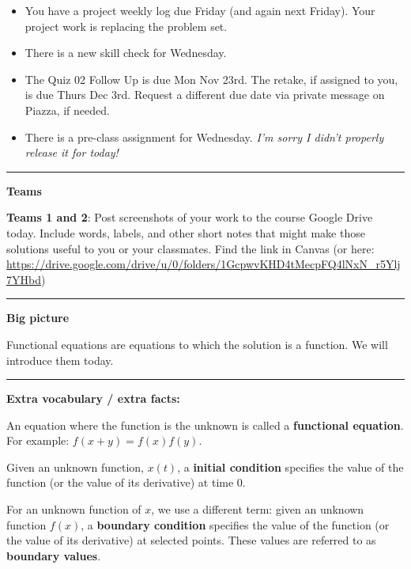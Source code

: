 \documentclass[12pt,letterpaper,noanswers]{exam}
\begin{document}
 \pdfpageheight 11in 
  \pdfpagewidth 8.5in

\noindent 




\begin{itemize}
\itemsep0em
\item You have a project weekly log due Friday (and again next Friday).  Your project work is replacing the problem set.
\item There is a new skill check for Wednesday.
\item The Quiz 02 Follow Up is due Mon Nov 23rd.  The retake, if assigned to you, is due Thurs Dec 3rd.  Request a different due date via private message on Piazza, if needed.
\item There is a pre-class assignment for Wednesday.  \emph{I'm sorry I didn't properly release it for today!}
\end{itemize}

\hrule
\vspace{0.2cm}



\noindent\textbf{Teams}



\noindent \textbf{Teams 1 and 2}: Post screenshots of your work to the course Google Drive today.  Include words, labels, and other short notes that might make those solutions useful to you or your classmates.  Find the link in Canvas (or here: \url{https://drive.google.com/drive/u/0/folders/1GcpwvKHD4tMecpFQ4lNxN_r5Ylj7YHbd})


\vspace{0.2cm}

\hrule
\vspace{0.2cm}


\noindent\textbf{Big picture}

Functional equations are equations to which the solution is a function.  We will introduce them today.

\vspace{0.2cm}
\hrule
\vspace{0.2cm}

\noindent \textbf{Extra vocabulary / extra facts:}
\begin{tcolorbox}
An equation where the function is the unknown is called a \textbf{functional equation}.  For example: $f(x+y) = f(x)f(y)$.  

Given an unknown function, $x(t)$, a \textbf{initial condition} specifies the value of the function (or the value of its derivative) at time $0$. 

For an unknown function of $x$, we use a different term: given an unknown function $f(x)$, a \textbf{boundary condition} specifies the value of the function (or the value of its derivative) at selected points.  These values are referred to as \textbf{boundary values}.
\end{tcolorbox}
\end{document}
